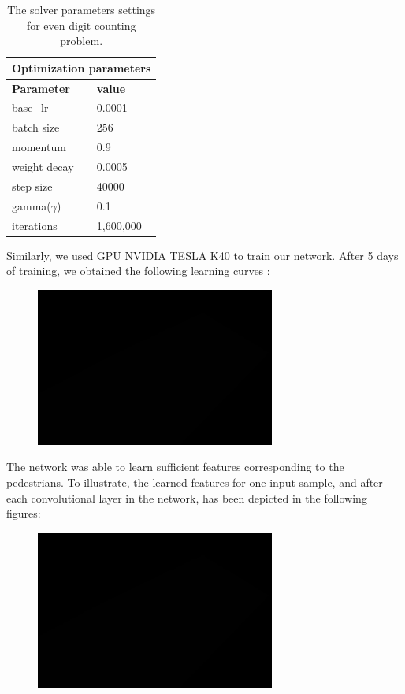 \begin{table}[H]
	\centering
			\caption{The solver parameters settings for even digit counting problem.}
	\begin{tabular}{ |p{2cm}|p{2cm}| }
	\hline 
	\multicolumn{2}{|c|}{\textbf{Optimization parameters}} \\
	\hline
	\hline
	\textbf{Parameter} & \textbf{value}\\
	\hline
	base\_lr & 0.0001\\
	\hline
	batch size & 256\\
	\hline
	momentum & 0.9  \\
	\hline
	weight decay & 0.0005\\
	\hline
	step size   & 40000 \\
	\hline
	gamma($\gamma$) & 0.1\\
	\hline
	iterations & 1,600,000\\
	\hline
	\end{tabular}

		\label{tab:solvparam}
\end{table}

\noindent Similarly, we used GPU NVIDIA TESLA K40 to train our network. After 5 days of training, we obtained the following learning curves :

\begin{figure}[H]
	\centering
	{\includegraphics[width=0.7\textwidth]{images/1}}
	\caption{}
	\label{fig:ucsdcurve}
\end{figure}

\noindent The network was able to learn sufficient features corresponding to the pedestrians. To illustrate, the learned features for one input sample, and after each convolutional layer in the network, has been depicted in the following figures: 



\begin{figure}[H]
	\centering
	{\includegraphics[width=0.7\textwidth]{images/1}}
	\caption{}
	\label{fig:feats}
\end{figure}

